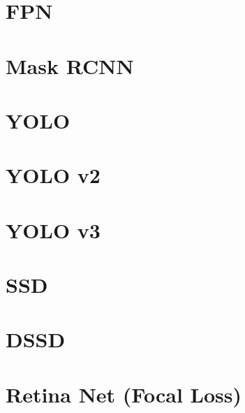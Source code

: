 \section{FPN}


\section{Mask RCNN}


\section{YOLO}


\section{YOLO v2}


\section{YOLO v3}


\section{SSD}


\section{DSSD}


\section{Retina Net (Focal Loss)}


